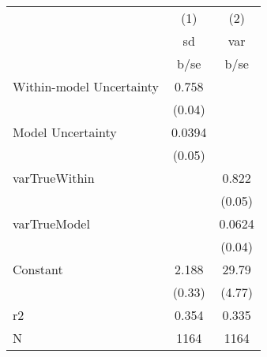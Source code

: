 {
\def\sym#1{\ifmmode^{#1}\else\(^{#1}\)\fi}
\begin{tabular}{l*{2}{c}}
\hline\hline
            &\multicolumn{1}{c}{(1)}&\multicolumn{1}{c}{(2)}\\
            &\multicolumn{1}{c}{sd}&\multicolumn{1}{c}{var}\\
            &        b/se&        b/se\\
\hline
Within-model Uncertainty&       0.758&            \\
            &      (0.04)&            \\
Model Uncertainty&      0.0394&            \\
            &      (0.05)&            \\
varTrueWithin&            &       0.822\\
            &            &      (0.05)\\
varTrueModel&            &      0.0624\\
            &            &      (0.04)\\
Constant    &       2.188&       29.79\\
            &      (0.33)&      (4.77)\\
\hline
r2          &       0.354&       0.335\\
N           &        1164&        1164\\
\hline\hline
\end{tabular}
}
